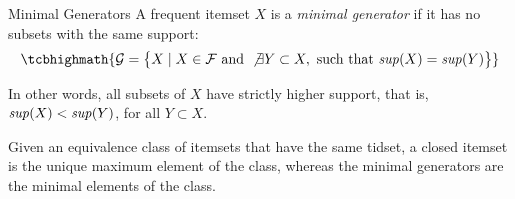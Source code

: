\begin{frame}{Minimal Generators}
A frequent itemset $X$ is a {\em minimal generator} if
it has no subsets with the same support:
\begin{align*}
\tcbhighmath{
\cG = \bigl\{X \mid X \in  \cF \text{ and } \not\exists Y \subset X,
\text{ such that } \supp(X) = \supp(Y)\bigr\}
}
\end{align*}

  \medskip
In other words, all subsets of $X$
have strictly higher support, that is,
  $\mathit{sup}(X) < \mathit{sup}(Y)$, for all $Y \subset X$.

  \medskip
Given an equivalence class of itemsets that have the
same tidset, a closed itemset is the unique maximum element of the class,
whereas the minimal generators are the minimal elements of the class.
\end{frame}


